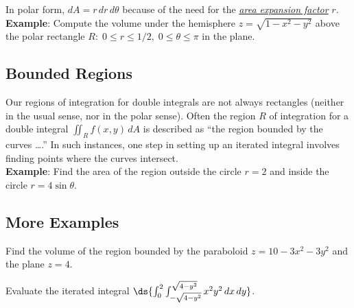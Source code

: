 \documentclass[12pt,fleqn]{article}
\def\eg#1{{\bf Example}: #1}
\begin{document}
  In polar form, $dA = r \,dr\,d\theta$ because of the need for the
  \href{http://www.math.umn.edu/~rogness/multivar/polartransformation.html}{{\em area expansion factor}} $r$.
\ei
\eg{}
Compute the volume under the hemisphere $z = \sqrt{1 - x^2 - y^2}$
above the polar rectangle $R: \; 0 \le r \le 1/2,
\; 0 \le \theta \le \pi$ in the plane.

\subsection*{Bounded Regions}
Our regions of integration for double integrals are not always
rectangles (neither in the usual sense, nor in the polar sense).
Often the region $R$ of integration for a double integral
$\iint_R f(x,y)\,dA$ is described as ``the region bounded
by the curves \ldots.''  In such instances, one step in
setting up an iterated integral involves finding points
where the curves intersect.\\[8pt]
\eg{}
Find the area of the region outside the circle
$r = 2$ and inside the circle $r = 4\sin\theta$.

\subsection*{More Examples}
\be
\item
  Find the volume of the region bounded by the paraboloid
  $z = 10 - 3x^2 - 3y^2$ and the plane $z = 4$.
\item
  Evaluate the iterated integral $\ds{\int_0^2
  \int_{-\sqrt{4-y^2}}^{\sqrt{4-y^2}} x^2 y^2 \,dx\,dy}$.
\ee
\end{document}
